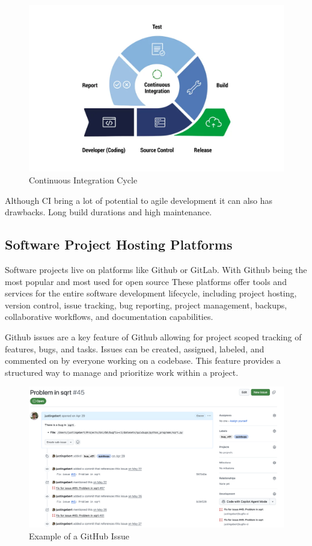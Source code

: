 \FloatBarrier
\begin{figure}[htbp]
    \centering
    \includegraphics[width=1\textwidth]{images/ci-cycle.png}
    \caption{Continuous Integration Cycle}
    \label{fig:ci-cycle}
\end{figure}
\FloatBarrier

Although CI bring a lot of potential to agile development it can also has drawbacks. Long build durations and high maintenance. %

\subsection{Software Project Hosting Platforms}
Software projects live on platforms like Github or GitLab. With Github being the most popular and most used for open source %
These platforms offer tools and services for the entire software development lifecycle, including project hosting, version control, issue tracking, bug reporting, project management, backups, collaborative workflows, and documentation capabilities. \cite{abrahamssonAgileSoftwareDevelopment2017}

Github issues are a key feature of Github allowing for project scoped tracking of features, bugs, and tasks. Issues can be created, assigned, labeled, and commented on by everyone working on a codebase. This feature provides a structured way to manage and prioritize work within a project.
\FloatBarrier
\begin{figure}[htbp]
    \centering
    \includegraphics[width=1\textwidth]{images/github/GitHub Issue.png}
    \caption{Example of a GitHub Issue}
    \label{fig:gh-issue}
\end{figure}
\FloatBarrier

